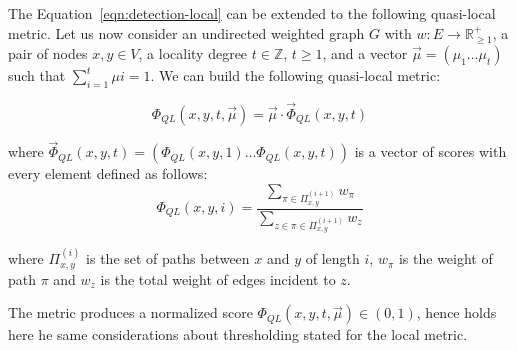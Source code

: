 The Equation~\ref{eqn:detection-local} can be extended to the following quasi-local metric. Let us now consider an undirected weighted graph $G$ with $w:E\rightarrow\mathbb{R}_{\geq1}^{+}$, a pair of nodes $x,y\in V$, a locality degree $t\in \mathbb{Z}$, $t\geq 1$, and a vector $\vec{\mu}=(\mu_{1}\ldots\mu_{t})$ such that $\sum_{i=1}^{t}\mu{i}=1$.
We can build the following quasi-local metric:

\begin{equation}
\label{eqn:detection-quasi-local-1}
\Phi_{QL}(x,y,t,\vec{\mu})=\vec{\mu}\cdot\vec{\Phi}_{QL}(x,y,t)
\end{equation}

where $\vec{\Phi}_{QL}(x,y,t)=(\Phi_{QL}(x,y,1)\ldots\Phi_{QL}(x,y,t))$ is a vector of scores with every element defined as follows:
\begin{equation}
\label{eqn:detection-quasi-local-2}
\Phi_{QL}(x,y,i)=
\frac{\sum\limits_{\pi\in\Pi_{x,y}^{(i+1)}}w_{\pi}}
{\sum\limits_{z\in\pi\in\Pi_{x,y}^{(i+1)}}w_{z}}
\end{equation}

where $\Pi_{x,y}^{(i)}$ is the set of paths between $x$ and $y$ of length $i$,
$w_{\pi}$ is the weight of path $\pi$ and
$w_{z}$ is the total weight of edges incident to $z$.

The metric produces a normalized score $\Phi_{QL}(x,y,t,\vec{\mu})\in(0,1)$, hence holds here he same considerations about thresholding stated for the local metric.